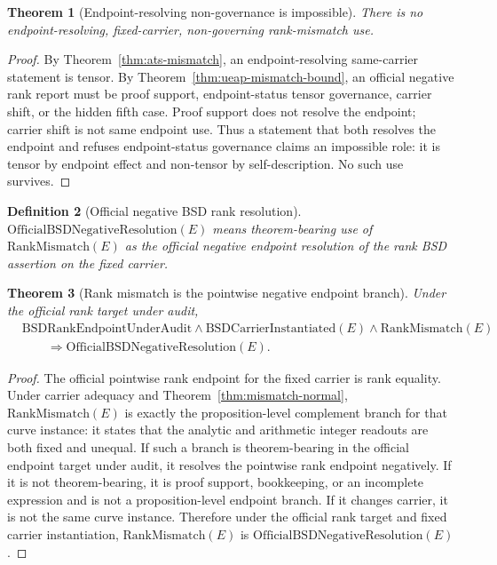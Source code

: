 \documentclass[11pt]{article}
\newtheorem{theorem}{Theorem}[section]
\newtheorem{definition}[theorem]{Definition}
\newcommand{\RankMismatch}{\mathrm{RankMismatch}}
\begin{document}
\begin{theorem}[Endpoint-resolving non-governance is impossible]\label{thm:hidden-fifth-rank}
There is no endpoint-resolving, fixed-carrier, non-governing rank-mismatch use.
\end{theorem}

\begin{proof}
By Theorem~\ref{thm:ats-mismatch}, an endpoint-resolving same-carrier statement is tensor. By Theorem~\ref{thm:ueap-mismatch-bound}, an official negative rank report must be proof support, endpoint-status tensor governance, carrier shift, or the hidden fifth case. Proof support does not resolve the endpoint; carrier shift is not same endpoint use. Thus a statement that both resolves the endpoint and refuses endpoint-status governance claims an impossible role: it is tensor by endpoint effect and non-tensor by self-description. No such use survives.
\end{proof}

\begin{definition}[Official negative BSD rank resolution]
$\mathrm{OfficialBSDNegativeResolution}(E)$ means theorem-bearing use of $\RankMismatch(E)$ as the official negative endpoint resolution of the rank BSD assertion on the fixed carrier.
\end{definition}

\begin{theorem}[Rank mismatch is the pointwise negative endpoint branch]\label{thm:mismatch-negative-occupation}
Under the official rank target under audit,
\[
\begin{aligned}
&\mathrm{BSDRankEndpointUnderAudit}\wedge
\mathrm{BSDCarrierInstantiated}(E)\wedge
\RankMismatch(E)\\
&\qquad\Rightarrow
\mathrm{OfficialBSDNegativeResolution}(E).
\end{aligned}
\]
\end{theorem}

\begin{proof}
The official pointwise rank endpoint for the fixed carrier is rank equality. Under carrier adequacy and Theorem~\ref{thm:mismatch-normal}, $\RankMismatch(E)$ is exactly the proposition-level complement branch for that curve instance: it states that the analytic and arithmetic integer readouts are both fixed and unequal. If such a branch is theorem-bearing in the official endpoint target under audit, it resolves the pointwise rank endpoint negatively. If it is not theorem-bearing, it is proof support, bookkeeping, or an incomplete expression and is not a proposition-level endpoint branch. If it changes carrier, it is not the same curve instance. Therefore under the official rank target and fixed carrier instantiation, $\RankMismatch(E)$ is $\mathrm{OfficialBSDNegativeResolution}(E)$.
\end{proof}
\end{document}

